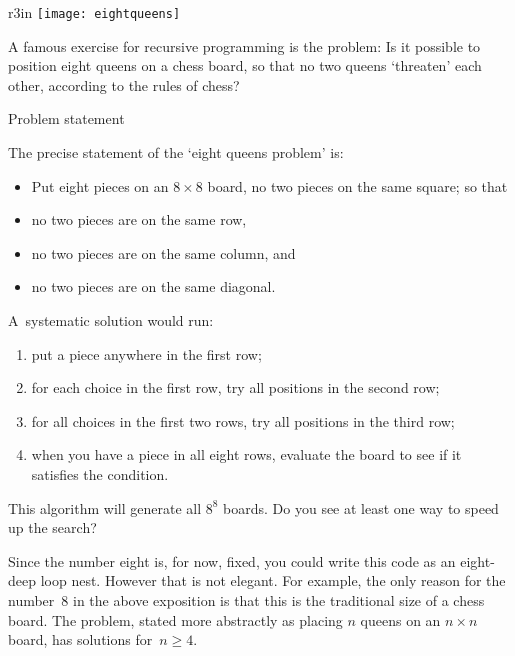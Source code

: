 
\begin{wrapfigure}{r}{3in}
  \texttt{[image: eightqueens]}
\end{wrapfigure}
A famous exercise for recursive programming is the
 problem:
Is it possible to position eight queens on a chess board,
so that no two queens `threaten' each other,
according to the rules of chess?

 {Problem statement}

The precise statement of the `eight queens problem' is:
\begin{itemize}
\item Put eight pieces on an $8\times8$ board, no two pieces on the same square; so that
\item no two pieces are on the same row,
\item no two pieces are on the same column, and
\item no two pieces are on the same diagonal.
\end{itemize}
A~systematic solution would run:
\begin{enumerate}
\item put a piece anywhere in the first row;
\item for each choice in the first row, try all positions in the second row;
\item for all choices in the first two rows, try all positions in the third row;
\item when you have a piece in all eight rows, evaluate the board to
  see if it satisfies the condition.
\end{enumerate}
\begin{exercise}
  This algorithm will generate all $8^8$ boards.
  Do you see at least one way to speed up the search?
\end{exercise}

Since the number eight is, for now, fixed, you could write this code
as an eight-deep loop nest. However that is not elegant.
For example, the only reason for the number~8 in the above exposition
is that this is the traditional size of a chess board.
The problem, stated more abstractly as placing $n$ queens on an $n\times n$ board,
has solutions for~$n\geq 4$.

